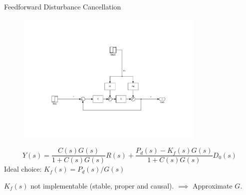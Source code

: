 \documentclass[10pt]{beamer}
\begin{document}
\begin{frame}{Feedforward Disturbance Cancellation}
  \begin{figure}[h]
    \centering %
    \includegraphics[width=0.8\textwidth, trim=8cm 4.5cm 5.97cm 8.5cm, clip=true]{../fig/matlab/ffdist}
  \end{figure}
  \begin{equation}
    \label{eq:ffdist}
    Y(s) = \frac{C(s)G(s)}{1+C(s)G(s)}R(s) + \frac{P_d(s) - K_f(s)G(s)}{1+C(s)G(s)}D_0(s)
  \end{equation}
  Ideal choice: $K_f(s)=P_d(s)/G(s)$

   $K_f(s)$ not implementable (stable, proper and causal). $\implies$
   Approximate $G$.
\end{frame}
\end{document}
